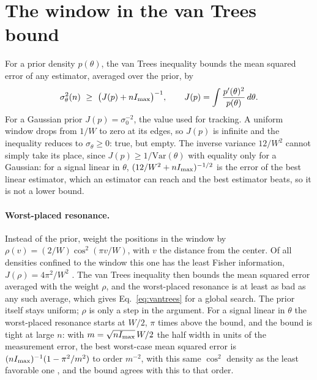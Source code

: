 \section{The window in the van Trees bound}
\label{app:prior}

For a prior density $p(\theta)$, the van Trees inequality \cite{vantrees1968,gill1995} bounds the mean squared error
of any estimator, averaged over the prior, by
\begin{equation*}
  \sigma_\theta^2(n)\ \ge\ \big(J(p)+nI_{\rm max}\big)^{-1},\qquad
  J(p)=\int\frac{p'(\theta)^2}{p(\theta)}\,d\theta .
\end{equation*}
For a Gaussian prior $J(p)=\sigma_0^{-2}$, the value used for tracking. A uniform window drops from $1/W$ to zero at
its edges, so $J(p)$ is infinite and the inequality reduces to $\sigma_\theta\ge0$: true, but empty. The inverse
variance $12/W^2$ cannot simply take its place, since $J(p)\ge1/\mathrm{Var}(\theta)$ with equality only for a
Gaussian: for a signal linear in $\theta$, $(12/W^2+nI_{\rm max})^{-1/2}$ is the error of the best linear estimator, which an
estimator can reach and the best estimator beats, so it is not a lower bound.

\paragraph{Worst-placed resonance.} Instead of the prior, weight the positions in the window by
$\rho(v)=(2/W)\cos^2(\pi v/W)$, with $v$ the distance from the center. Of all densities confined to the window this one
has the least Fisher information, $J(\rho)=4\pi^2/W^2$ \cite{gill1995}. The van Trees inequality then bounds the mean
squared error averaged with the weight $\rho$, and the worst-placed resonance is at least as bad as any such average,
which gives Eq.~\eqref{eq:vantrees} for a global search. The prior itself stays uniform; $\rho$ is only a step in the
argument. For a signal linear in $\theta$ the worst-placed
resonance starts at $W/2$, $\pi$ times above the bound, and the bound is tight at large $n$: with $m=\sqrt{nI_{\rm max}}\,W/2$
the half width in units of the measurement error, the best worst-case mean squared error is $(nI_{\rm max})^{-1}(1-\pi^2/m^2)$
to order $m^{-2}$, with this same $\cos^2$ density as the least favorable one \cite{bickel1981}, and the bound agrees
with this to that order.

